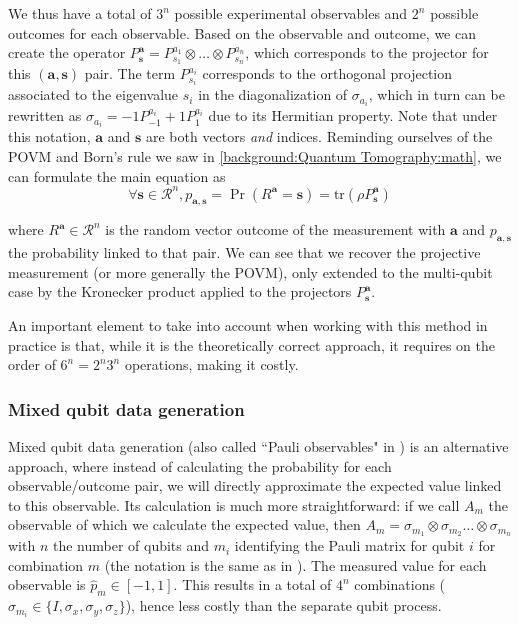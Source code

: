 \documentclass[12pt]{memoir}
\newcommand{\tr}{\text{tr}}
\newcommand{\mb}{\mathbf}
\newcommand{\ti}{\textit}
\begin{document}
We thus have a total of $3^n$ possible experimental observables and $2^n$ possible outcomes for each observable. Based on the observable and outcome, we can create the operator $P^\mb a_{\mb s} = P^{a_1}_{s_1} \otimes \dots \otimes P^{a_n}_{s_n}$, which corresponds to the projector for this $(\mb a,\mb s)$ pair. The term $P^{a_i}_{s_i}$ corresponds to the orthogonal projection associated to the eigenvalue $s_i$ in the diagonalization of $\sigma_{a_i}$, which in turn can be rewritten as $\sigma_{a_i} = -1P^{a_i}_{-1} + 1P^{a_i}_1$ due to its Hermitian property. Note that under this notation, $\mb a$ and $\mb s$ are both vectors \ti{and} indices. Reminding ourselves of the POVM and Born's rule we saw in \ref{background:Quantum Tomography:math}, we can formulate the main equation as
\begin{equation}
    \forall \mb s \in \mathcal{R}^n, p_{\mb a,\mb s} = \Pr(R^{\mb a} = \mb s) = \tr(\rho P^{\mb a}_{\mb s})
\end{equation}

where $R^\mb{a} \in \mathcal{R}^n$ is the random vector outcome of the measurement with $\mb a$ and $p_{\mb a,\mb s}$ the probability linked to that pair. We can see that we recover the projective measurement (or more generally the POVM), only extended to the multi-qubit case by the Kronecker product applied to the projectors $P^{\mb a}_\mb{ s}$.\medbreak


An important element to take into account when working with this method in practice is that, while it is the theoretically correct approach, it requires on the order of $6^n = 2^n 3^n$ operations, making it costly.





\subsubsection*{Mixed qubit data generation}\label{section:mixed-qub-dg}


Mixed qubit data generation (also called ``Pauli observables" in \cite{Guta20}) is an alternative approach, where instead of calculating the probability for each observable/outcome pair, we will directly approximate the expected value linked to this observable. Its calculation is much more straightforward: if we call $A_m$ the observable of which we calculate the expected value, then $A_m = \sigma_{m_1} \otimes \sigma_{m_2} \dots \otimes \sigma_{m_n}$ with $n$ the number of qubits and $m_i$ identifying the Pauli matrix for qubit $i$ for combination $m$ (the notation is the same as in \cite{meth:bayesian:Langevin:ACMT2024}). The measured value for each observable is $\hat p_m \in[-1, 1]$. This results in a total of $4^n$ combinations ($\sigma_{m_i} \in \{I, \sigma_x, \sigma_y, \sigma_z\}$), hence less costly than the separate qubit process.
\end{document}
